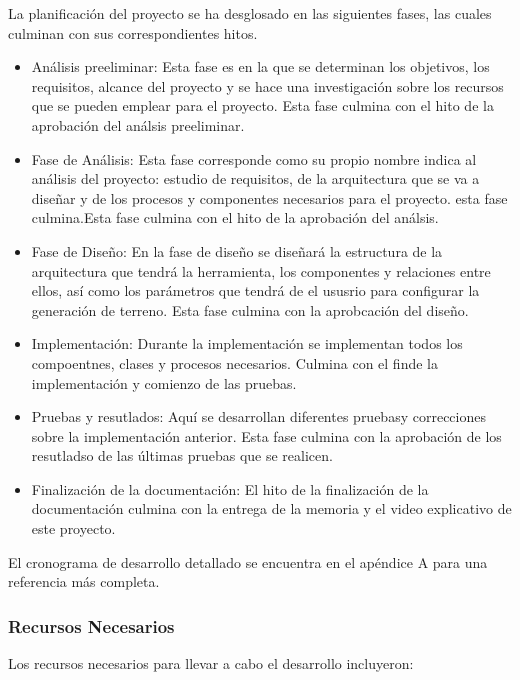 La planificación del proyecto se ha desglosado en las siguientes fases, las cuales culminan con sus correspondientes hitos.
\begin{itemize}
    \item Análisis preeliminar: Esta fase es en la que se determinan los objetivos, los requisitos, alcance del proyecto y se hace una investigación sobre los recursos que se pueden emplear para el proyecto. Esta fase culmina con el hito de la aprobación del análsis preeliminar.
    \item Fase de Análisis: Esta fase corresponde como su propio nombre indica al análisis del proyecto: estudio de requisitos, de la arquitectura que se va a diseñar y de los procesos y componentes necesarios para el proyecto. esta fase culmina.Esta fase culmina con el hito de la aprobación del análsis.
    \item Fase de Diseño: En la fase de diseño se diseñará la estructura de la arquitectura que tendrá la herramienta, los componentes y relaciones entre ellos, así como los parámetros que tendrá de el ususrio para configurar la generación de terreno. Esta fase culmina con la aprobcación del diseño.
    \item Implementación: Durante la implementación se implementan todos los compoentnes, clases y procesos necesarios. Culmina con el finde la implementación y comienzo de las pruebas.
    \item Pruebas y resutlados: Aquí se desarrollan diferentes pruebasy correcciones sobre la implementación anterior. Esta fase culmina con la aprobación de los resutladso de las últimas pruebas que se realicen.
    \item Finalización de la documentación: El hito de la finalización de la documentación culmina con la entrega de la memoria y el video explicativo de este proyecto.
\end{itemize}

El cronograma de desarrollo detallado se encuentra en el apéndice A para una referencia más completa.

\subsubsection{Recursos Necesarios}
Los recursos necesarios para llevar a cabo el desarrollo incluyeron:

